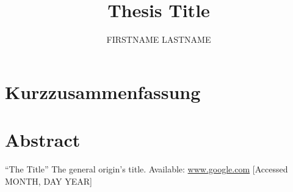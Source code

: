 \documentclass[
paper = a4,
fontsize = 12pt,
headinclude = true,
open = right,
twoside = true,
BCOR = 10mm,
toc = listofnumbered,
numbers = noendperiod,
]{report}
\title{Thesis Title}
\author{FIRSTNAME LASTNAME}
\date{\currenttime}
\begin{document}
	

	

	

    \section*{Kurzzusammenfassung}
	
    \section*{Abstract}
    

    \clearpage

	\tableofcontents
    \clearpage

	

	

    

    

	

    
    \clearpage
	\printglossary[type=\acronymtype,title=Abkürzungsverzeichnis,toctitle=Abkürzungsverzeichnis]

	\printglossary[title=Glossar,toctitle=Glossar]
    \clearpage

    \listoftables
    \listoffigures

    \begin{thebibliography}{9}

     ``The Title'' The general origin's title. Available: \url{www.google.com} [Accessed MONTH, DAY YEAR]

    \end{thebibliography}
\end{document}
